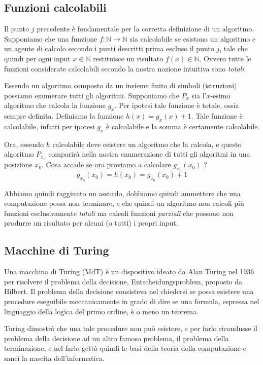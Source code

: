 \documentclass[a4paper,titlepage]{article}
\theoremstyle{definition}
\newcommand{\N}{\mathbb{N}}
\begin{document}
\subsection{Funzioni calcolabili}
Il punto $j$ precedente è fondamentale per la corretta definizione di un algoritmo. Supponiamo che una funzione $f:\N\longrightarrow\N$ sia calcolabile se esistono un algoritmo e un agente di calcolo secondo i punti descritti prima escluso il punto $j$, tale che quindi per ogni input $x\in\N$ restituisce un risultato $f(x)\in\N$. Ovvero tutte le funzioni considerate calcolabili secondo la nostra nozione intuitiva sono \textit{totali}. 

Essendo un algoritmo composto da un insieme finito di simboli (istruzioni) possiamo enumerare tutti gli algoritmi. Supponiamo che $P_x$ sia l'$x$-esimo algoritmo che calcola la funzione $g_x$. Per ipotesi tale funzione è totale, ossia sempre definita. Definiamo la funzione $h(x) = g_x(x) + 1$. Tale funzione è calcolabile, infatti per ipotesi $g_x$ è calcolabile e la somma è certamente calcolabile. 

Ora, essendo $h$ calcolabile deve esistere un algoritmo che la calcola, e questo algoritmo $P_{x_0}$ comparirà nella nostra enumerazione di tutti gli algoritmi in una posizione $x_0$. Cosa accade se ora proviamo a calcolare $g_{x_0}(x_0)$ ?  
\[
	g_{x_0}(x_0) = h(x_0) = g_{x_0}(x_0) + 1
\]

Abbiamo quindi raggiunto un assurdo, dobbiamo quindi ammettere che una computazione possa non terminare, e che quindi un algoritmo non calcoli più funzioni esclusivamente \textit{totali} ma calcoli funzioni \textit{parziali} che possono non produrre un risultato per alcuni (o tutti) i propri input.  

\subsection{Macchine di Turing}
Una macchina di Turing (MdT) è un dispositivo ideato da Alan Turing nel 1936 per risolvere il problema della decisione, Entscheidungsproblem, proposto da Hilbert. Il problema della decisione consisteva nel chiedersi se possa esistere una procedure eseguibile meccanicamente in grado di dire se una formula, espressa nel linguaggio della logica del primo ordine, è o meno un teorema. 

Turing dimostrò che una tale procedure non può esistere, e per farlo ricondusse il problema della decisione ad un altro famoso problema, il problema della terminazione, e nel farlo gettò quindi le basi della teoria della computazione e sancì la nascita dell'informatica. 
\end{document}
